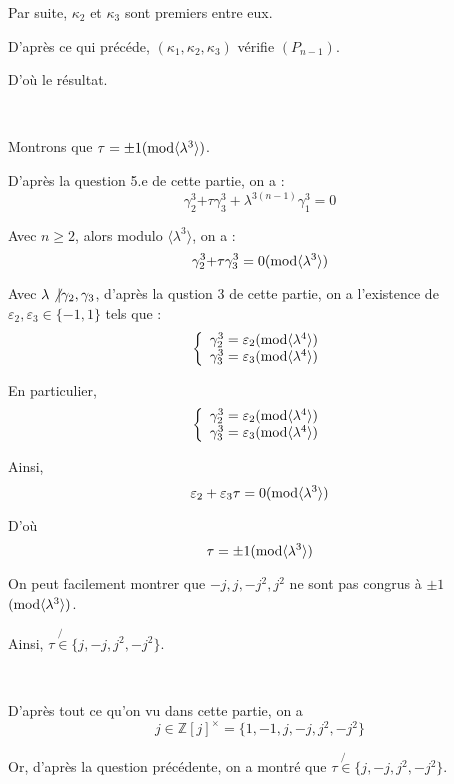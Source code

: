 Par suite, $\kappa_2$ et $\kappa_3$ sont premiers entre eux.

D'apr{\`e}s ce qui pr{\'e}c{\'e}de, $(\kappa_1, \kappa_2, \kappa_3)$
v{\'e}rifie $(P_{n - 1})$.

D'o{\`u} le r{\'e}sultat.

\

 Montrons que $\tau = \pm 1 (\operatorname{mod} \langle \lambda^3
\rangle)$.

D'apr{\`e}s la question 5.e de cette partie, on a :
\[ \gamma^3_2 {{+ \tau \gamma_3^3}  }  + \lambda^{3 (n - 1)} \gamma^3_1 = 0 \]


Avec $n \geqslant 2$, alors modulo $\langle \lambda^3 \rangle$, on a :
\[ \gamma^3_2 {{+ \tau \gamma_3^3}  }  = 0 (\operatorname{mod} \langle \lambda^3
   \rangle) \]


Avec $\lambda \not{| } \gamma_2, \gamma_3$, d'apr{\`e}s la qustion 3
de cette partie, on a l'existence de $\varepsilon_2, \varepsilon_3 \in \{ - 1,
1 \}$ tels que :
\[ \left\{\begin{array}{l}
     \gamma^3_{ 2} = \varepsilon_2  (\operatorname{mod} \langle \lambda^4 \rangle)\\
     \gamma^3_{ 3} = \varepsilon_3  (\operatorname{mod} \langle \lambda^4 \rangle)
   \end{array}\right. \]


En particulier,
\[ \left\{\begin{array}{l}
     \gamma^3_{ 2} = \varepsilon_2  (\operatorname{mod} \langle \lambda^4 \rangle)\\
     \gamma^3_{ 3} = \varepsilon_3  (\operatorname{mod} \langle \lambda^4 \rangle)
   \end{array}\right. \]


Ainsi,
\[ \varepsilon_2 + \varepsilon_3 \tau = 0 (\operatorname{mod} \langle \lambda^3
   \rangle) \]


D'o{\`u}
\[ \tau = \pm 1 (\operatorname{mod} \langle \lambda^3 \rangle) \]


On peut facilement montrer que $- j, j, - j^2, j^2$ ne sont pas congrus {\`a}
$\pm 1$ $(\operatorname{mod} \langle \lambda^3 \rangle)$.

Ainsi, $\tau \not{\in} \{ j, - j, j^2, - j^2 \}$.

\

 D'apr{\`e}s tout ce qu'on vu dans cette partie, on a
\[ j \in \mathbb{Z} [j]^{\times} = \{ 1, - 1, j, - j, j^2, - j^2 \} \]


Or, d'apr{\`e}s la question pr{\'e}c{\'e}dente, on a montr{\'e} que $\tau
\not{\in} \{ j, - j, j^2, - j^2 \}$.

